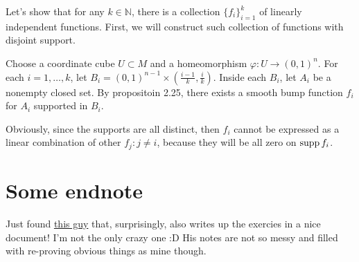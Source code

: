 \documentclass[a4paper]{article}
\begin{document}
\begin{exercise}[2-7]
  Let's show that for any $k \in \mathbb{N}$, there is a collection $\{f_i\}_{i=1}^k$
  of linearly independent functions. First, we will construct such collection of 
  functions with disjoint support.

  Choose a coordinate cube $U \subset M$ and a homeomorphism $\varphi \colon U \to (0,1)^n$.
  For each $i = 1, \dots ,k$, let $B_i = (0,1)^{n-1} \times (\frac{i-1}{k}, \frac{i}{k})$.
  Inside each $B_i$, let $A_i$ be a nonempty closed set. By propositoin 2.25,
  there exists a smooth bump function $f_i$ for $A_i$ supported in $B_i$.

  Obviously, since the supports are all distinct, then $f_i$ cannot be expressed
  as a linear combination of other $f_j \colon j \ne i$, because they will be
  all zero on $\operatorname{supp} f_i$.
\end{exercise}




\section{Some endnote}

Just found \href{https://wj32.org/wp/wp-content/uploads/2012/12/Introduction-to-Smooth-Manifolds.pdf}{this guy}
that, surprisingly, also writes up the exercies in a nice document!
I'm not the only crazy one :D His notes are not so messy and filled with re-proving
obvious things as mine though.
\end{document}
